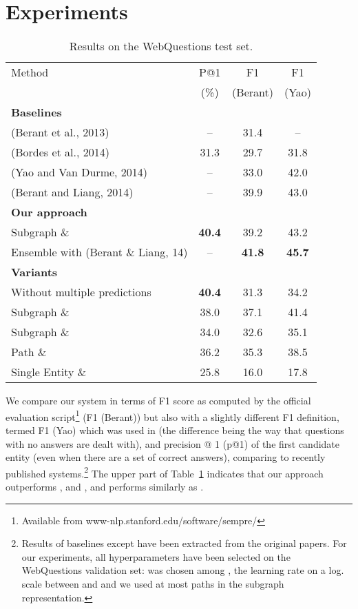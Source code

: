 \documentclass[runningheads,a4paper]{llncs}
\newcommand{\wq}{{\sc WebQuestions}\xspace}
\newcommand{\us}{Our approach}
\begin{document}
\section{Experiments} 


\begin{table}[t!]
\begin{center}
\begin{tabular}{|@{\,\,}l@{\,}|c|@{}c@{}|c|}
\hline
Method & P@1 & F1 & F1\\
& (\%) & (Berant) & (Yao)\\
\hline
{\bf Baselines} &&&\\
(Berant et al., 2013) \cite{berant-EtAl:2013:EMNLP} & -- & 31.4 & -- \\
(Bordes et al., 2014) \cite{bordes2014open} &  31.3 & 29.7 & 31.8 \\
(Yao and Van Durme, 2014)  \cite{yao2014information} & -- & 33.0 & 42.0\\
(Berant and Liang, 2014) \cite{berant2014semantic} & -- & 39.9 & 43.0\\
\hline
{\bf \us} & & & \\
Subgraph \&   & \bf 40.4 & 39.2 & 43.2\\
Ensemble with (Berant \& Liang, 14) & -- &\bf 41.8 &\bf 45.7\\
\hline
{\bf Variants} & & & \\
Without multiple predictions  &\bf  40.4 & 31.3 & 34.2 \\
Subgraph \&  & 38.0 & 37.1 & 41.4\\
Subgraph \&   & 34.0 & 32.6 & 35.1\\
Path  \&  & 36.2 & 35.3 & 38.5\\
Single Entity  \&  & 25.8 & 16.0 & 17.8\\
\hline
\end{tabular}
\caption{\label{tab:res} Results on the \wq test set.}
\end{center}
\end{table}







We compare our system in terms of F1 score as computed by the official
evaluation script\footnote{Available from
  www-nlp.stanford.edu/software/sempre/} (F1 (Berant)) but also with a
slightly different F1 definition, termed F1 (Yao) which was used in
\cite{yao2014information} (the difference being the way that questions
with no answers are dealt with), and precision @ 1 (p@1) of the first
candidate entity (even when there are a set of correct answers),
comparing to recently published systems.\footnote{Results of baselines
  except \cite{bordes2014open} have been extracted from the original
  papers. For our experiments, all hyperparameters have been selected
  on the \wq validation set:  was chosen among ,
  the learning rate on a log. scale between  and 
  and we used at most  paths in the subgraph representation.}
The upper part of Table~\ref{tab:res} indicates that our approach
outperforms \cite{yao2014information},
\cite{berant-EtAl:2013:EMNLP} and \cite{bordes2014open}, and performs
similarly as \cite{berant2014semantic}.
\end{document}
